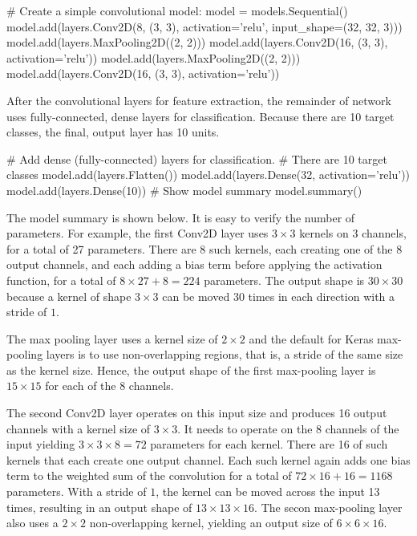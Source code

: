 \begin{pythoncode}
# Create a simple convolutional model:
model = models.Sequential()
model.add(layers.Conv2D(8, (3, 3), activation='relu', 
    input_shape=(32, 32, 3)))
model.add(layers.MaxPooling2D((2, 2)))
model.add(layers.Conv2D(16, (3, 3), activation='relu'))
model.add(layers.MaxPooling2D((2, 2)))
model.add(layers.Conv2D(16, (3, 3), activation='relu'))
\end{pythoncode}

After the convolutional layers for feature extraction, the remainder of network uses fully-connected, dense layers for classification. Because there are 10 target classes, the final, output layer has 10 units.

\begin{pythoncode}
# Add dense (fully-connected) layers for classification. 
# There are 10 target classes
model.add(layers.Flatten())
model.add(layers.Dense(32, activation='relu'))
model.add(layers.Dense(10))
# Show model summary
model.summary()
\end{pythoncode}

The model summary is shown below. It is easy to verify the number of parameters. For example, the first Conv2D layer uses $3 \times 3$ kernels on 3 channels, for a total of 27 parameters. There are 8 such kernels, each creating one of the 8 output channels, and each adding a bias term before applying the activation function, for a total of $8 \times 27 + 8 = 224$ parameters. The output shape is $30 \times 30$ because a kernel of shape $3 \times 3$ can be moved 30 times in each direction with a stride of $1$.

The max pooling layer uses a kernel size of $2 \times 2$ and the default for Keras max-pooling layers is to use non-overlapping regions, that is, a stride of the same size as the kernel size. Hence, the output shape of the first max-pooling layer is $15 \times 15$ for each of the 8 channels. 

The second Conv2D layer operates on this input size and produces 16 output channels with a kernel size of $3 \times 3$. It needs to operate on the 8 channels of the input yielding $3 \times 3 \times 8 = 72$ parameters for each kernel. There are 16 of such kernels that each create one output channel. Each such kernel again adds one bias term to the weighted sum of the convolution for a total of $72 \times 16 + 16 = 1168$ parameters. With a stride of $1$, the kernel can be moved across the input 13 times, resulting in an output shape of $13 \times 13 \times 16$. The secon max-pooling layer also uses a $2 \times 2$ non-overlapping kernel, yielding an output size of $6 \times 6 \times 16$.

